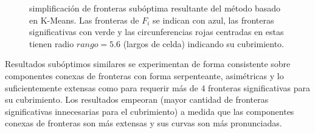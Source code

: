 \begin{figure}[H]
  \centering
  \qquad

  \caption[Simplificación de fronteras subóptima resultante del método basado en K-Means.]{simplificación de fronteras subóptima resultante del método basado en K-Means. Las fronteras de $F_i$ se indican con azul, las fronteras significativas con verde y las
    circunferencias rojas centradas en estas tienen radio $rango=5.6$ (largos de celda) indicando su
    cubrimiento.}\label{fig:ejemploFSKMMal}
\end{figure}
Resultados subóptimos similares se experimentan de forma consistente sobre
componentes conexas de fronteras con forma serpenteante, asimétricas y lo suficientemente
extensas como para requerir más de 4 fronteras significativas para su
cubrimiento. 
Los resultados empeoran (mayor cantidad de fronteras significativas
innecesarias para el cubrimiento) a medida que las componentes conexas de
fronteras son más extensas y sus curvas son más pronunciadas.

